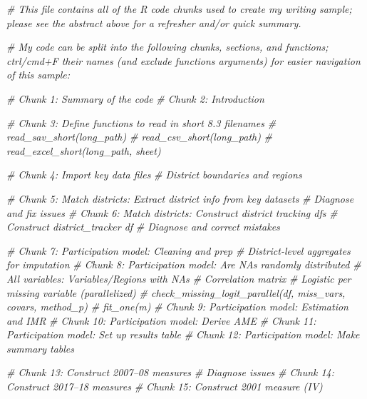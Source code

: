\documentclass[
]{article}
\newenvironment{Shaded}{\begin{snugshade}}{\end{snugshade}}
\newcommand{\CommentTok}[1]{\textcolor[rgb]{0.56,0.35,0.01}{\textit{#1}}}
\begin{document}
\begin{Shaded}
\begin{Highlighting}[]
\CommentTok{\# This file contains all of the R code chunks used to create my writing sample; please see the abstract above for a refresher and/or quick summary.}


\CommentTok{\# My code can be split into the following chunks, sections, and functions; ctrl/cmd+F their names (and exclude functions\textquotesingle{} arguments) for easier navigation of this sample:}

\CommentTok{\# Chunk 1: Summary of the code}
\CommentTok{\# Chunk 2: Introduction}

\CommentTok{\# Chunk 3: Define functions to read in short 8.3 filenames}
  \CommentTok{\# read\_sav\_short(long\_path)}
  \CommentTok{\# read\_csv\_short(long\_path)}
  \CommentTok{\# read\_excel\_short(long\_path, sheet)}

\CommentTok{\# Chunk 4: Import key data files}
  \CommentTok{\# District boundaries and regions}

\CommentTok{\# Chunk 5: Match districts: Extract district info from key datasets}
  \CommentTok{\# Diagnose and fix issues}
\CommentTok{\# Chunk 6: Match districts: Construct district tracking dfs}
  \CommentTok{\# Construct district\_tracker df}
  \CommentTok{\# Diagnose and correct mistakes}

\CommentTok{\# Chunk 7: Participation model: Cleaning and prep}
  \CommentTok{\# District{-}level aggregates for imputation}
\CommentTok{\# Chunk 8: Participation model: Are NAs randomly distributed}
  \CommentTok{\# All variables: Variables/Regions with NAs}
  \CommentTok{\# Correlation matrix}
  \CommentTok{\# Logistic per missing variable (parallelized)}
    \CommentTok{\# check\_missing\_logit\_parallel(df, miss\_vars, covars, method\_p)}
    \CommentTok{\# fit\_one(m)}
\CommentTok{\# Chunk 9: Participation model: Estimation and IMR}
\CommentTok{\# Chunk 10: Participation model: Derive AME}
\CommentTok{\# Chunk 11: Participation model: Set up results table}
\CommentTok{\# Chunk 12: Participation model: Make summary tables}

\CommentTok{\# Chunk 13: Construct 2007–08 measures}
  \CommentTok{\# Diagnose issues}
\CommentTok{\# Chunk 14: Construct 2017–18 measures}
\CommentTok{\# Chunk 15: Construct 2001 measure (IV)}


\end{Highlighting}
\end{Shaded}
\end{document}
